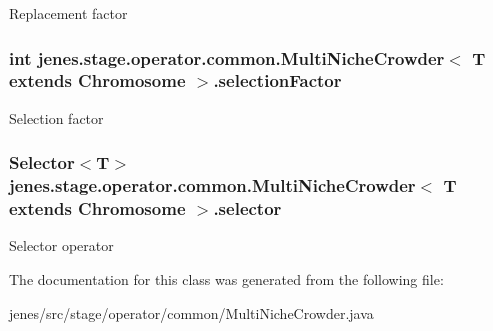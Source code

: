 Replacement factor \hypertarget{classjenes_1_1stage_1_1operator_1_1common_1_1_multi_niche_crowder_3_01_t_01extends_01_chromosome_01_4_ab561927a8af185e69bd5fcf85e904d7a}{
\subsubsection[{selection\-Factor}]{\setlength{\rightskip}{0pt plus 5cm}int jenes.\-stage.\-operator.\-common.\-Multi\-Niche\-Crowder$<$ T extends Chromosome $>$.selection\-Factor\hspace{0.3cm}{\ttfamily [protected]}}}\label{classjenes_1_1stage_1_1operator_1_1common_1_1_multi_niche_crowder_3_01_t_01extends_01_chromosome_01_4_ab561927a8af185e69bd5fcf85e904d7a}
Selection factor \hypertarget{classjenes_1_1stage_1_1operator_1_1common_1_1_multi_niche_crowder_3_01_t_01extends_01_chromosome_01_4_aec9f82fc79b7a63f5e664dfbcc7e9563}{
\subsubsection[{selector}]{\setlength{\rightskip}{0pt plus 5cm}Selector$<$T$>$ jenes.\-stage.\-operator.\-common.\-Multi\-Niche\-Crowder$<$ T extends Chromosome $>$.selector\hspace{0.3cm}{\ttfamily [protected]}}}\label{classjenes_1_1stage_1_1operator_1_1common_1_1_multi_niche_crowder_3_01_t_01extends_01_chromosome_01_4_aec9f82fc79b7a63f5e664dfbcc7e9563}
Selector operator 

The documentation for this class was generated from the following file\-:\begin{DoxyCompactItemize}
\item 
jenes/src/stage/operator/common/Multi\-Niche\-Crowder.\-java\end{DoxyCompactItemize}
